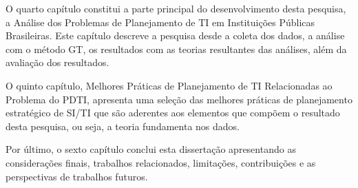 O quarto capítulo constitui a parte principal do desenvolvimento desta pesquisa, a Análise dos Problemas de Planejamento de TI em Instituições Públicas Brasileiras. Este capítulo descreve a pesquisa desde a coleta dos dados, a análise com o método GT, os resultados com as teorias resultantes das análises, além da avaliação dos resultados.

O quinto capítulo, Melhores Práticas de Planejamento de TI Relacionadas ao Problema do PDTI, apresenta uma seleção das melhores práticas de planejamento estratégico de SI/TI que são aderentes aos elementos que compõem o resultado desta pesquisa, ou seja, a teoria fundamenta nos dados.

Por último, o sexto capítulo conclui esta dissertação apresentando as considerações finais, trabalhos relacionados, limitações, contribuições e as perspectivas de trabalhos futuros.